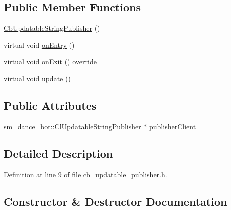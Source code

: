 \subsection*{Public Member Functions}
\begin{DoxyCompactItemize}
\item 
\hyperlink{classsm__dance__bot_1_1CbUpdatableStringPublisher_afa35b9261578b2497253a9275454426b}{Cb\+Updatable\+String\+Publisher} ()
\item 
virtual void \hyperlink{classsm__dance__bot_1_1CbUpdatableStringPublisher_a9167c33305953b7aed74bf7f35f1eae8}{on\+Entry} ()
\item 
virtual void \hyperlink{classsm__dance__bot_1_1CbUpdatableStringPublisher_a16af5659caeae65c4782a4fcf82ac05e}{on\+Exit} () override
\item 
virtual void \hyperlink{classsm__dance__bot_1_1CbUpdatableStringPublisher_a60984c937ed690724be1d2cc27cd24ea}{update} ()
\end{DoxyCompactItemize}
\subsection*{Public Attributes}
\begin{DoxyCompactItemize}
\item 
\hyperlink{classsm__dance__bot_1_1ClUpdatableStringPublisher}{sm\+\_\+dance\+\_\+bot\+::\+Cl\+Updatable\+String\+Publisher} $\ast$ \hyperlink{classsm__dance__bot_1_1CbUpdatableStringPublisher_ab14197ec2915c3bb9830e5324ef2be9a}{publisher\+Client\+\_\+}
\end{DoxyCompactItemize}


\subsection{Detailed Description}


Definition at line 9 of file cb\+\_\+updatable\+\_\+publisher.\+h.



\subsection{Constructor \& Destructor Documentation}

